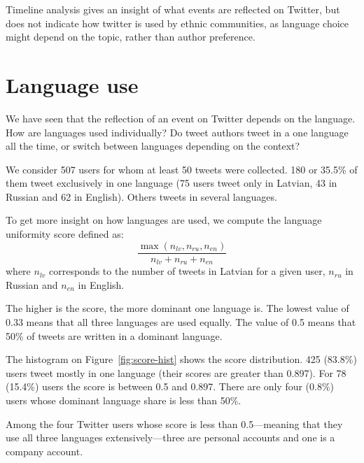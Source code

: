 \documentclass[11pt,a4paper]{article}
\begin{document}

Timeline analysis gives an insight of what events are reflected on Twitter, but does not indicate how twitter is used by ethnic communities, as language choice might depend on the topic, rather than author preference.

\section{Language use}
\label{sec:lang-use}



We have seen that the reflection of an event on Twitter depends on the language. How are languages used individually? Do tweet authors tweet in a one language all the time, or switch between languages depending on the context?

We consider 507 users for whom at least 50 tweets were collected. 180 or 35.5\% of them tweet exclusively in one language (75 users tweet only in Latvian, 43 in Russian and 62 in English). Others tweets in several languages.

To get more insight on how languages are used, we compute the language uniformity score defined as:
\begin{equation}
  \label{eq:score}
  \frac{\max(n_\mathit{lv}, n_\mathit{ru}, n_\mathit{en})}{n_\mathit{lv} + n_\mathit{ru} + n_\mathit{en}}
\end{equation}
where $n_\mathit{lv}$ corresponds to the number of tweets in Latvian for a given user, $n_\mathit{ru}$ in Russian and $n_\mathit{en}$ in English.

The higher is the score, the more dominant one language is. The lowest value of 0.33 means that all three languages are used equally. The value of 0.5 means that 50\% of tweets are written in a dominant language.

The histogram on Figure~\ref{fig:score-hist} shows the score distribution. 425 (83.8\%) users tweet mostly in one language (their scores are greater than 0.897). For 78  (15.4\%) users the score is between 0.5 and 0.897. There are only four (0.8\%) users whose dominant language share is less than 50\%.

Among the four Twitter users whose score is less than 0.5---meaning that they use all three languages extensively---three are personal accounts and one is a company account.
\end{document}
